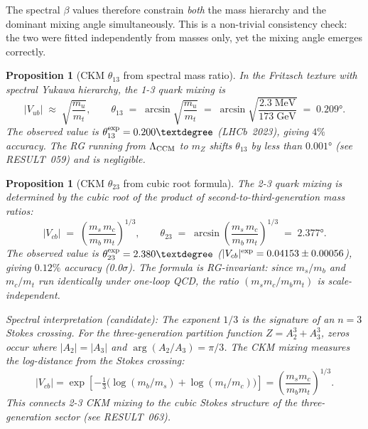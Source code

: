 \documentclass[12pt]{article}
\newtheorem{proposition}[theorem]{Proposition}
\theoremstyle{definition}
\theoremstyle{remark}
\begin{document}
The spectral $\beta$ values therefore constrain \emph{both} the mass hierarchy
and the dominant mixing angle simultaneously. This is a non-trivial consistency
check: the two were fitted independently from masses only, yet the mixing angle
emerges correctly.

\begin{proposition}[CKM $\theta_{13}$ from spectral mass ratio]
\label{prop:theta13}
In the Fritzsch texture with spectral Yukawa hierarchy, the 1-3 quark mixing is
\begin{equation}
  |V_{ub}| \;\approx\; \sqrt{\frac{m_u}{m_t}}, \qquad
  \theta_{13} \;=\; \arcsin\!\sqrt{\frac{m_u}{m_t}}
  \;=\; \arcsin\!\sqrt{\frac{2.3\;\mathrm{MeV}}{173\;\mathrm{GeV}}}
  \;=\; 0.209°.
\end{equation}
The observed value is $\theta_{13}^{\rm exp} = 0.200°$ (LHCb~2023), giving
$4\%$ accuracy.  The RG running from $\Lambda_{\rm CCM}$ to $m_Z$ shifts
$\theta_{13}$ by less than $0.001°$ (see RESULT~059) and is negligible.
\end{proposition}

\begin{proposition}[CKM $\theta_{23}$ from cubic root formula]
\label{prop:theta23}
The 2-3 quark mixing is determined by the cubic root of the product of
second-to-third-generation mass ratios:
\begin{equation}
  |V_{cb}| \;=\; \left(\frac{m_s\,m_c}{m_b\,m_t}\right)^{1/3},
  \qquad
  \theta_{23} \;=\; \arcsin\!\left(\frac{m_s\,m_c}{m_b\,m_t}\right)^{1/3}
  \;=\; 2.377°.
\end{equation}
The observed value is $\theta_{23}^{\rm exp} = 2.380°$ ($|V_{cb}|^{\rm exp} = 0.04153 \pm 0.00056$),
giving $\mathbf{0.12\%}$ accuracy (0.0$\sigma$).  The formula is RG-invariant:
since $m_s/m_b$ and $m_c/m_t$ run identically under one-loop QCD, the ratio
$(m_s m_c/m_b m_t)$ is scale-independent.

\emph{Spectral interpretation (candidate):}
The exponent $1/3$ is the signature of an $n=3$ Stokes crossing.
For the three-generation partition function $Z = A_2^3 + A_3^3$,
zeros occur where $|A_2| = |A_3|$ and $\arg(A_2/A_3) = \pi/3$.
The CKM mixing measures the log-distance from the Stokes crossing:
\[
  |V_{cb}| = \exp\!\left[-\tfrac{1}{3}\bigl(\log(m_b/m_s) + \log(m_t/m_c)\bigr)\right]
           = \left(\frac{m_s m_c}{m_b m_t}\right)^{1/3}.
\]
This connects 2-3 CKM mixing to the cubic Stokes structure of the
three-generation sector (see RESULT~063).
\end{proposition}
\end{document}
